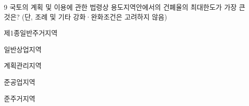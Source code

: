 \begin{question}{9}
국토의 계획 및 이용에 관한 법령상 용도지역안에서의 건폐율의 최대한도가 가장 큰 것은? (단, 조례 및 기타 강화·완화조건은 고려하지 않음)
\begin{choices}
  \item 제1종일반주거지역
  \item 일반상업지역
  \item 계획관리지역
  \item 준공업지역
  \item 준주거지역
\end{choices}
\end{question}
